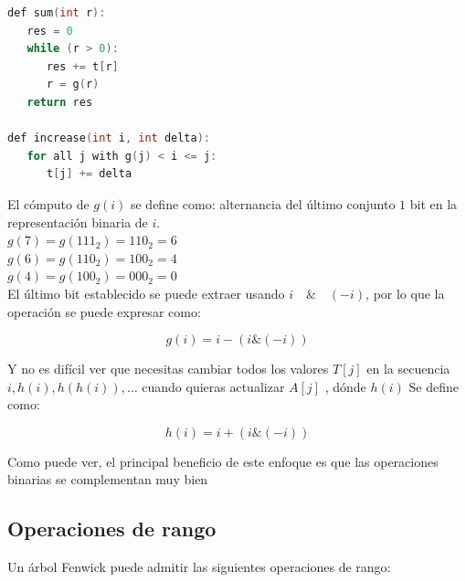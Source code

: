 \begin{lstlisting}[language=C++]
def sum(int r):
   res = 0
   while (r > 0):
      res += t[r]
      r = g(r)
   return res

def increase(int i, int delta):
   for all j with g(j) < i <= j:
      t[j] += delta
\end{lstlisting}

El cómputo de $g(i)$ se define como: alternancia del último conjunto $1$ bit en la representación binaria de $i$.\\
$g(7) = g(111_2) = 110_2 = 6$ \\
$g(6) = g(110_2) = 100_2 = 4$ \\
$g(4) = g(100_2) = 000_2 = 0$ \\

El último bit establecido se puede extraer usando $i \quad \& \quad (-i)$, por lo que la operación se puede expresar como:


$$g(i) = i - (i \& (-i))$$

Y no es difícil ver que necesitas cambiar todos los valores $T[j]$ en la secuencia $i,h(i),h(h(i)), 
\dots$ cuando quieras actualizar $A[j]$ , dónde $h(i)$ Se define como:

$$h(i) = i + (i \& (-i))$$

Como puede ver, el principal beneficio de este enfoque es que las operaciones binarias se complementan muy bien

\subsection{Operaciones de rango}

Un árbol Fenwick puede admitir las siguientes operaciones de rango:

